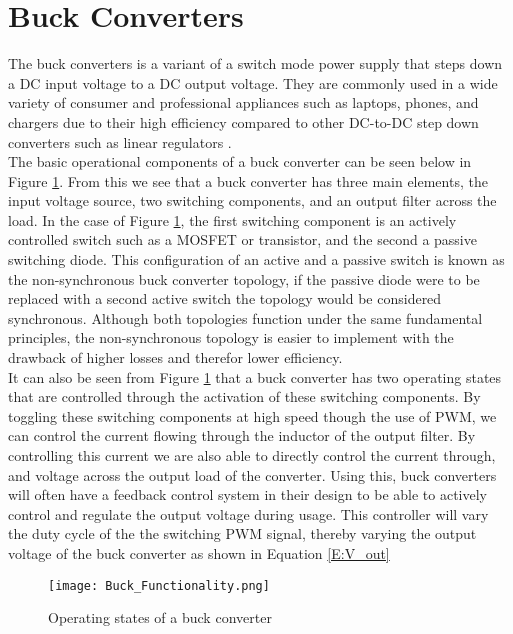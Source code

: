 \section{Buck Converters}\label{S:buck}

The buck converters is a variant of a switch mode power supply that steps down a DC input voltage to a DC output voltage. They are commonly used in a wide variety of consumer and professional appliances such as laptops, phones, and chargers due to their high efficiency compared to other DC-to-DC step down converters such as linear regulators \cite{Mohan2012}.\\

The basic operational components of a buck converter can be seen below in Figure \ref{F:buck_func}. From this we see that a buck converter has three main elements, the input voltage source, two switching components, and an output filter across the load. In the case of Figure \ref{F:buck_func}, the first switching component is an actively controlled switch such as a MOSFET or transistor, and the second a passive switching diode. This configuration of an active and a passive switch is known as the non-synchronous buck converter topology, if the passive diode were to be replaced with a second active switch the topology would be considered synchronous. Although both topologies function under the same fundamental principles, the non-synchronous topology is easier to implement with the drawback of higher losses and therefor lower efficiency.\\

It can also be seen from Figure \ref{F:buck_func} that a buck converter has two operating states that are controlled through the activation of these switching components. By toggling these switching components at high speed though the use of PWM, we can control the current flowing through the inductor of the output filter. By controlling this current we are also able to directly control the current through, and voltage across the output load of the converter. Using this, buck converters will often have a feedback control system in their design to be able to actively control and regulate the output voltage during usage. This controller will vary the duty cycle of the the switching PWM signal, thereby varying the output voltage of the buck converter as shown in Equation \ref{E:V_out}\\

\begin{figure}[H]
      \texttt{[image: Buck\_Functionality.png]}
      \caption{Operating states of a buck converter}
      \label{F:buck_func}
  \end{figure}


